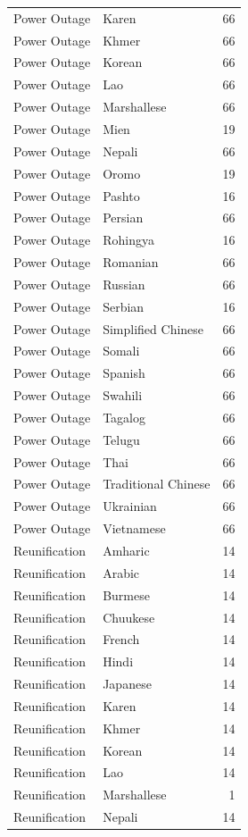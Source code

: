 \begin{longtable}{p{3cm} p{3cm} r}
Power Outage & Karen & 66 \\
Power Outage & Khmer & 66 \\
Power Outage & Korean & 66 \\
Power Outage & Lao & 66 \\
Power Outage & Marshallese & 66 \\
Power Outage & Mien & 19 \\
Power Outage & Nepali & 66 \\
Power Outage & Oromo & 19 \\
Power Outage & Pashto & 16 \\
Power Outage & Persian & 66 \\
Power Outage & Rohingya & 16 \\
Power Outage & Romanian & 66 \\
Power Outage & Russian & 66 \\
Power Outage & Serbian & 16 \\
Power Outage & Simplified Chinese & 66 \\
Power Outage & Somali & 66 \\
Power Outage & Spanish & 66 \\
Power Outage & Swahili & 66 \\
Power Outage & Tagalog & 66 \\
Power Outage & Telugu & 66 \\
Power Outage & Thai & 66 \\
Power Outage & Traditional Chinese & 66 \\
Power Outage & Ukrainian & 66 \\
Power Outage & Vietnamese & 66 \\
Reunification & Amharic & 14 \\
Reunification & Arabic & 14 \\
Reunification & Burmese & 14 \\
Reunification & Chuukese & 14 \\
Reunification & French & 14 \\
Reunification & Hindi & 14 \\
Reunification & Japanese & 14 \\
Reunification & Karen & 14 \\
Reunification & Khmer & 14 \\
Reunification & Korean & 14 \\
Reunification & Lao & 14 \\
Reunification & Marshallese & 1 \\
Reunification & Nepali & 14 \\

\end{longtable}
